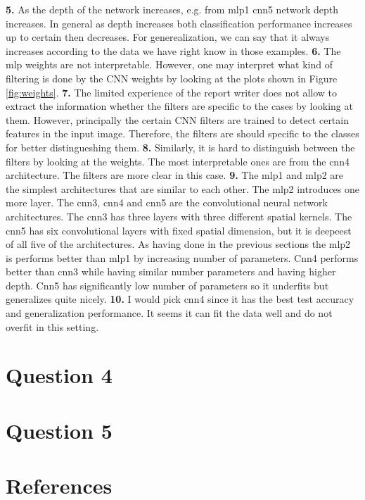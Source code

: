 \documentclass{assignment}
\begin{document}
\textbf{5.}
As the depth of the network increases, e.g. from mlp1 cnn5 network depth increases. In general as depth increases both classification performance increases up to certain then decreases. For generealization, we can say that it always increases according to the data we have right know in those examples. 
\textbf{6.}
The mlp weights are not interpretable. However, one may interpret what kind of filtering is done by the CNN weights by looking at the plots shown in Figure \ref{fig:weights}.
\textbf{7.}
The limited experience of the report writer does not allow to extract the information whether the filters are specific to the cases by looking at them. However, principally the certain CNN filters are trained to detect certain features in the input image. Therefore, the filters are should specific to the classes for better distingueshing them. 
\textbf{8.}
Similarly, it is hard to distinguish between the filters by looking at the weights. The most interpretable ones are from the cnn4 architecture. The filters are more clear in this case.
\textbf{9.}
The mlp1 and mlp2 are the simplest architectures that are similar to each other. The mlp2 introduces one more layer. The cnn3, cnn4 and cnn5 are the convolutional neural network architectures. The cnn3 has three layers with three different spatial kernels. The cnn5 has six convolutional layers with fixed spatial dimension, but it is deepeest of all five of the architectures. As having done in the previous sections the mlp2 is performs better than mlp1 by increasing number of parameters. Cnn4 performs better than cnn3 while having similar number parameters and having higher depth. Cnn5 has significantly low number of parameters so it underfits but generalizes quite nicely.
\textbf{10.}
I would pick cnn4 since it has the best test accuracy and generalization performance. It seems it can fit the data well and do not overfit in this setting.

\section{Question 4}

\section{Question 5}




\newpage
\section{References}
\nocite{*} 
   
     
\end{document}
